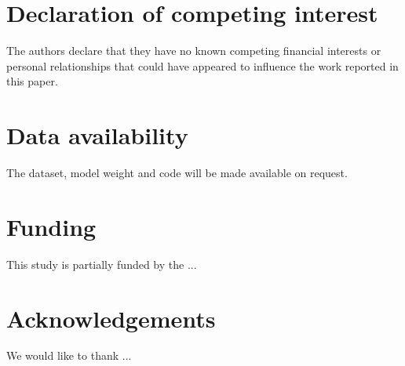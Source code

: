 \documentclass[12pt]{article}
\begin{document}
\section*{Declaration of competing interest}
The authors declare that they have no known competing financial interests or personal relationships that could have appeared to influence the work reported in this paper.

\section*{Data availability}
The dataset, model weight and code will be made available on request.

\section*{Funding}
This study is partially funded by the ...

\section*{Acknowledgements}
We would like to thank ... \citep{blok_highthroughput_2025}

{\clearpage}



\end{document}
